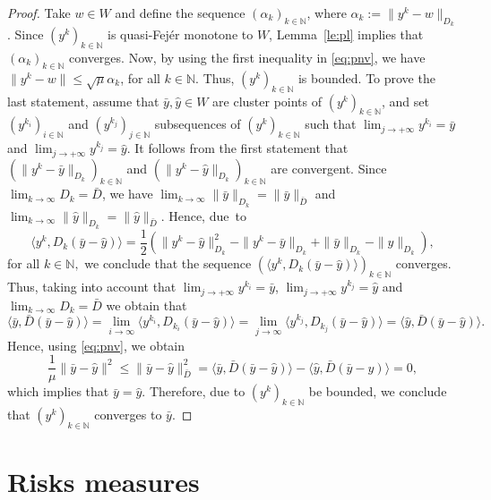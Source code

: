 \begin{proof}
	Take $w\in W$ and define the sequence $(\alpha_k)_{k\in\mathbb{N}}$, where $\alpha_k:=\|y^{k}-w\|_{D_{k}}$. Since $(y^k)_{k\in\mathbb{N}}$ is quasi-Fej\'er  monotone to $W$, Lemma~\ref{le:pl} implies that $(\alpha_k)_{k\in\mathbb{N}}$ converges. Now, by using  the  first  inequality in \eqref{eq:pnv}, we have  $\|y^{k}-w\|\leq \sqrt{\mu} \alpha_k$, for all $k\in  \mathbb{N}$.  Thus, $(y^k)_{k\in\mathbb{N}}$ is bounded. To prove the last statement, assume that   ${\bar y}, {\hat y} \in  W$   are  cluster points of $(y^k)_{k\in\mathbb{N}}$, and set   $(y^{k_i})_{i\in\mathbb{N}}$ and  $(y^{k_j})_{j\in\mathbb{N}}$  subsequences  of $(y^k)_{k\in\mathbb{N}}$ such that $\lim_{j\to +\infty} y^{k_i} = {\bar y}$ and $\lim_{j\to +\infty} y^{k_j} = {\hat y}$. It follows from the first statement that  $(\|y^{k}- {\bar y}\|_{D_{k}})_{k\in\mathbb{N}}$ and  $(\|y^{k}- {\hat y}\|_{D_{k}})_{k\in\mathbb{N}}$ are convergent. Since $\lim_{k\rightarrow\infty}D_k={\bar D}$, we have  $\lim_{k\rightarrow\infty}\|{\bar y}\|_{D_k}={\|\bar y}\|_{{\bar D}}$ and $\lim_{k\rightarrow\infty}\|{\hat y}\|_{D_k}={\|\hat y}\|_{{\bar D}}$. Hence,  due~to
	$$
		\langle y^k,  D_k({\bar y}- {\hat y})\rangle=\frac{1}{2}(\|y^{k}- {\hat y}\|_{D_{k}}^2-\|y^{k}- {\bar y}\|_{D_{k}} +\| {\bar y}\|_{D_{k}}-\| {\hat y}\|_{D_{k}}),
	$$
	for all $k\in {\mathbb N},$ we conclude that the sequence  $(\langle  y^k,  D_k({\bar y}- {\hat y})\rangle)_{k\in\mathbb{N}}$ converges.  Thus, taking into account that   $\lim_{j\to +\infty} y^{k_i} = {\bar y}$, $\lim_{j\to +\infty} y^{k_j} = {\hat y}$ and  $\lim_{k\rightarrow\infty}D_k={\bar D}$ we obtain that
	$$
		\langle  {\bar y},  {\bar D}({\bar y}- {\hat y})\rangle=\lim_{i\rightarrow\infty} \langle y^{k_i},  D_{k_i}({\bar y}- {\hat y})\rangle=\lim_{j\rightarrow\infty} \langle y^{k_j},  D_{k_j}({\bar y}- {\hat y})\rangle= \langle  {\hat y},  {\bar D}({\bar y}- {\hat y})\rangle.
	$$
	Hence, using \eqref{eq:pnv}, we obtain
	$$
		\frac{1}{\mu}\|{\bar y}- {\hat y}\|^2\leq  \|{\bar y}- {\hat y}\|^2_{\bar D}=  \langle  {\bar y},  {\bar D}({\bar y}- {\hat y})\rangle-  \langle  {\hat y},  {\bar D}({\bar y}- {\hat y})\rangle=0,
	$$
	which implies that ${\bar y}= {\hat y}$. Therefore, due to  $(y^k)_{k\in\mathbb{N}}$ be bounded, we conclude that    $(y^k)_{k\in\mathbb{N}}$ converges to ${\bar y}$.
\end{proof}

\section{Risks measures}

